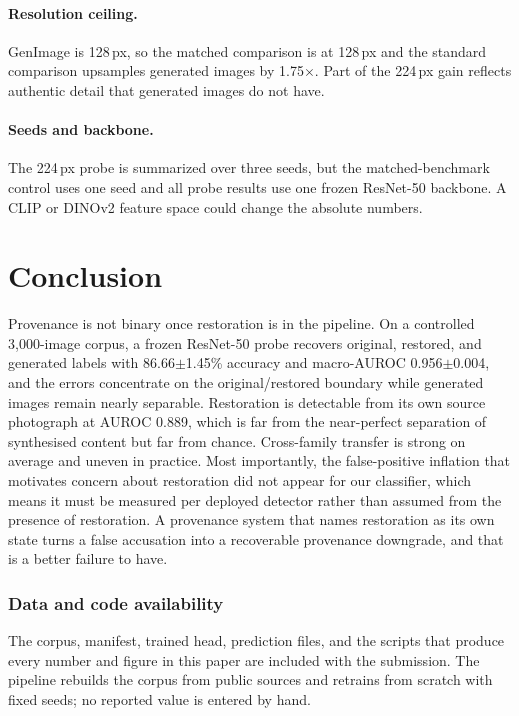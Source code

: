 ﻿\documentclass[graybox,norunningheads]{svmult}
\begin{document}
\paragraph{Resolution ceiling.} GenImage is 128\,px, so the matched comparison is at
128\,px and the standard comparison upsamples generated images by 1.75$\times$. Part
of the 224\,px gain reflects authentic detail that generated images do not have.

\paragraph{Seeds and backbone.} The 224\,px probe is summarized over three seeds,
but the matched-benchmark control uses one seed and all probe results use one frozen
ResNet-50 backbone. A CLIP or DINOv2 feature space could change the absolute
numbers.

\section{Conclusion}

Provenance is not binary once restoration is in the pipeline. On a controlled
3{,}000-image corpus, a frozen ResNet-50 probe recovers original, restored, and
generated labels with 86.66$\pm$1.45\% accuracy and macro-AUROC
0.956$\pm$0.004, and the errors
concentrate on the original/restored boundary while generated images remain nearly
separable. Restoration is detectable from its own source photograph at AUROC 0.889,
which is far from the near-perfect separation of synthesised content but far from
chance. Cross-family transfer is strong on average and uneven in practice. Most
importantly, the false-positive inflation that motivates concern about restoration
did not appear for our classifier, which means it must be measured per deployed
detector rather than assumed from the presence of restoration. A provenance system
that names restoration as its own state turns a false accusation into a
recoverable provenance downgrade, and that is a better failure to have.

\subsubsection*{Data and code availability}
The corpus, manifest, trained head, prediction files, and the scripts that produce
every number and figure in this paper are included with the submission. The pipeline
rebuilds the corpus from public sources and retrains from scratch with fixed seeds;
no reported value is entered by hand.



\end{document}
